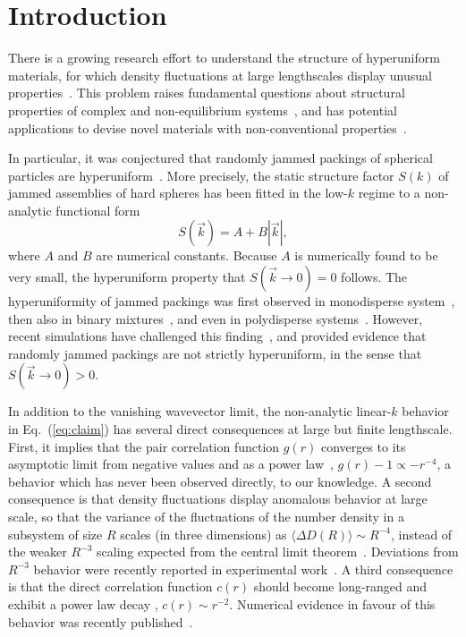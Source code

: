 \documentclass[aps,pre,twocolumn,superscriptaddress]{revtex4-1}
\begin{document}
\section{Introduction}

There is a growing research effort to understand 
the structure of hyperuniform materials, for which 
density fluctuations at large lengthscales display 
unusual 
properties~\cite{torquato2003,donev2005,zachary2009,jiao2014,more_sal}. 
This problem raises fundamental
questions about structural properties of complex
and non-equilibrium systems~\cite{hexner,jack2015,tjhung2015,denis}, 
and has potential applications
to devise novel materials with non-conventional 
properties~\cite{mat1,mat2,mat3,mat4,mat5}.

In particular, it was conjectured 
that randomly jammed packings of spherical particles 
are hyperuniform~\cite{torquato2003}. 
More precisely, the static structure factor $S(k)$ 
of jammed  assemblies of hard spheres has been 
fitted in the low-$k$ regime to a non-analytic functional 
form~\cite{donev2005,hopkins2012} 
\begin{equation}
S(\vec{k}) = A + B | \vec{k} |,
\label{eq:claim}
\end{equation}
where $A$ and $B$ are numerical constants. Because $A$ is
numerically found to be very small, the hyperuniform property
that $S( \vec{k} \to 0) = 0$ follows. 
The hyperuniformity of jammed packings 
was first observed in monodisperse system~\cite{donev2005,silbert2009}, 
then also in binary mixtures~\cite{zachary2011,berthier2011}, 
and even in polydisperse 
systems~\cite{berthier2011,kurita2010,kurita2011}. 
However, recent simulations have challenged 
this finding~\cite{wu2015,ikeda2015,atkinson2016b}, 
and provided evidence that randomly jammed packings 
are not strictly hyperuniform, in the sense that  $S( \vec{k} \to 0) > 0$.

In addition to the vanishing wavevector 
limit, the non-analytic linear-$k$ behavior in 
Eq.~(\ref{eq:claim}) has several direct consequences
at large but finite lengthscale. First, it implies 
that the pair correlation function $g(r)$ converges to 
its asymptotic limit from negative values
and as a power law~\cite{donev2005}, $g(r) - 1 \propto - r^{-4}$,
a behavior which has never been observed directly, to our knowledge. 
A second consequence is that density fluctuations 
display anomalous behavior at large scale, 
so that the variance of the fluctuations of the number density
in a subsystem of size $R$ scales (in three dimensions) as 
$\langle \Delta D(R) \rangle \sim R^{-4}$, instead of the 
weaker $R^{-3}$ scaling expected from the central limit 
theorem~\cite{torquato2003,zachary2009}. Deviations 
from $R^{-3}$ behavior were recently reported 
in experimental work~\cite{dreyfus2015}.
A third consequence is that the direct correlation 
function $c(r)$ should become long-ranged and 
exhibit a power law decay \cite{torquato2003}, $c(r) \sim r^{-2}$. Numerical 
evidence in favour of this behavior was recently published~\cite{atkinson2016}. 
 
\end{document}
